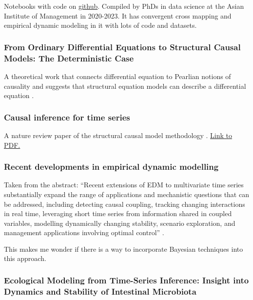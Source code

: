 \documentclass{article}
\begin{document}
        Notebooks with code on \href{https://phdinds-aim.github.io/time_series_handbook/Preface/Preface.html}{github}.
        Compiled by PhDs in data science at the Asian Institute of Management in 2020-2023.
        It has convergent cross mapping and empirical dynamic modeling in it with lots of code and datasets.

    \subsubsection*{From Ordinary Differential Equations to Structural Causal Models: The Deterministic Case}
        
        A theoretical work that connects differential equation to Pearlian notions of causality
        and suggests that structural equation models can describe a differential equation \cite{mooij2013ordinary}.

    \subsubsection*{Causal inference for time series}
        
        A nature review paper of the structural causal model methodology \cite{runge2023causal}.
        \href{https://climateinformaticslab.com/wp-content/uploads/2023/06/Runge_Causal_Inference_for_Time_Series_NREE.pdf}
        {Link to PDF.}

    \subsubsection*{Recent developments in empirical dynamic modelling}

        Taken from the abstract: ``Recent extensions of EDM to multivariate
        time series substantially expand the range of applications and mechanistic
        questions that can be addressed, including detecting causal coupling, tracking
        changing interactions in real time, leveraging short time series from information shared
        in coupled variables, modelling dynamically changing stability, scenario exploration, and management
        applications involving optimal control'' \cite{munch2023recent}.

        This makes me wonder if there is a way to incorporate Bayesian techniques
        into this approach.

    \subsubsection*{Ecological Modeling from Time-Series Inference: Insight into Dynamics and Stability of Intestinal Microbiota}
\end{document}
